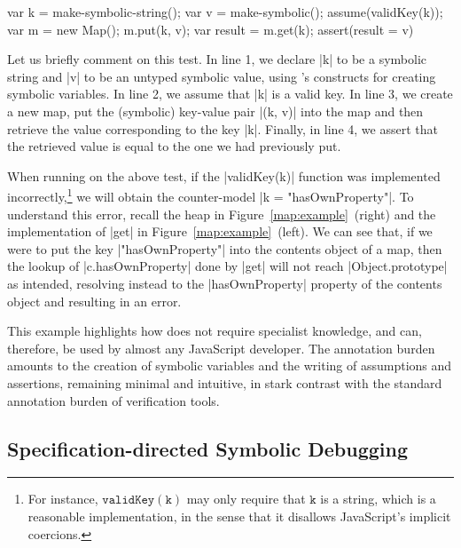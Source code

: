 \begin{lstjs}
var k = make-symbolic-string(); var v = make-symbolic();
assume(validKey(k));
var m = new Map(); m.put(k, v); var result = m.get(k);  
assert(result = v)
\end{lstjs}

Let us briefly comment on this test. In line 1, we declare \jsinline|k| to be a symbolic string and \jsinline|v| to be an untyped symbolic value, using \jilette's constructs for creating symbolic variables. In line 2, we assume that \jsinline|k| is a valid key. In line 3, we create a new map, put the (symbolic) key-value pair \jsinline|(k, v)| into the map and then retrieve the value corresponding to the key \jsinline|k|. Finally, in line 4, we assert that the retrieved value is equal to the one we had previously put.

% 
When running \jilette on the above test, if the \jsinline|validKey(k)| function was implemented incorrectly,\footnote{For instance, $\mathtt{validKey(k)}$ may only require that $\mathtt{k}$ is a string, which is a reasonable implementation, in the sense that it disallows JavaScript's implicit coercions.}
we will obtain the counter-model \jsinline|k = "hasOwnProperty"|. To understand this error, recall the heap in Figure~\ref{map:example}~(right) and the implementation of \jsinline|get| in Figure~\ref{map:example}~(left). We can see that, if we were to put the key \jsinline|"hasOwnProperty"| into the contents object of a map, then the lookup of \jsinline|c.hasOwnProperty| done by \jsinline|get| will not reach \jsinline|Object.prototype| as intended, resolving instead to the \jsinline|hasOwnProperty| property of the contents object and resulting in an error.

This example highlights how \jilette does not require specialist knowledge, and can, therefore, 
be used by almost any JavaScript developer. The annotation burden amounts to the creation of 
symbolic variables and the writing of assumptions and assertions, remaining minimal and intuitive, in stark contrast  with the standard annotation burden of verification tools.


\subsection{Specification-directed Symbolic Debugging}

